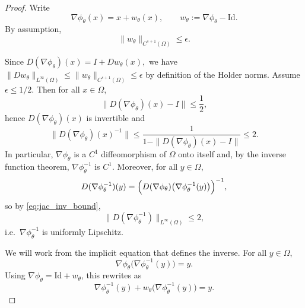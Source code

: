 \documentclass[10pt,a4paper]{amsart}
\begin{document}
\begin{proof}
   Write
\begin{equation}
\nabla \phi_\theta(x) = x + w_\theta(x),
\qquad
w_\theta := \nabla \phi_\theta - \mathrm{Id}.
\end{equation}
By assumption,
\begin{equation}
\label{eq:ass_w_small}
\|w_\theta\|_{C^{s+1}(\Omega)} \le \epsilon.
\end{equation}

Since
$
D(\nabla\phi_\theta)(x) = I + Dw_\theta(x),
$ 
we have
$
\|Dw_\theta\|_{L^\infty(\Omega)} \le \|w_\theta\|_{C^{s+1}(\Omega)} \le \epsilon
$ by definition of the Holder norms.
Assume $\epsilon\le 1/2$. Then for all $x\in\Omega$,
\begin{equation}
\|D(\nabla\phi_\theta)(x) - I\| \le \frac12,
\end{equation}
hence $D(\nabla\phi_\theta)(x)$ is invertible and
\begin{equation}
\label{eq:jac_inv_bound}
\bigl\|D(\nabla\phi_\theta)(x)^{-1}\bigr\| \le \frac{1}{1-\|D(\nabla\phi_\theta)(x)-I\|} \le 2.
\end{equation}
In particular, $\nabla\phi_\theta$ is a $C^1$ diffeomorphism of $\Omega$ onto itself and, by the inverse function theorem,
$\nabla\phi_\theta^{-1}$ is $C^1$. Moreover, for all $y\in\Omega$,
\begin{equation}
\label{eq:Ds_formula}
D(\nabla\phi_\theta^{-1})(y)
=
\Bigl(D(\nabla\phi_\theta)\bigl(\nabla\phi_\theta^{-1}(y)\bigr)\Bigr)^{-1},
\end{equation}
so by \eqref{eq:jac_inv_bound},
\begin{equation}
\label{eq:lip_inverse}
\|D(\nabla\phi_\theta^{-1})\|_{L^\infty(\Omega)} \le 2,
\end{equation}
i.e.\ $\nabla\phi_\theta^{-1}$ is uniformly Lipschitz.

We will work from the implicit equation that defines the inverse.
For all $y\in\Omega$,
\begin{equation}
\label{eq:implicit_identity}
\nabla\phi_\theta\bigl(\nabla\phi_\theta^{-1}(y)\bigr) = y.
\end{equation}
Using $\nabla\phi_\theta = \mathrm{Id}+w_\theta$, this rewrites as
\begin{equation}
\label{eq:implicit_identity_2}
\nabla\phi_\theta^{-1}(y) + w_\theta\bigl(\nabla\phi_\theta^{-1}(y)\bigr) = y.
\end{equation}


\end{proof}
\end{document}
